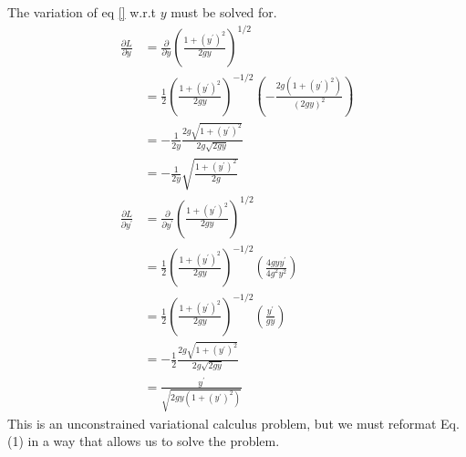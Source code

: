 \documentclass[11pt]{article}
\begin{document}
The variation of eq \ref{} w.r.t $y$ must be solved for.
\begin{align*}
    \frac{\partial L}{\partial y}        & = \frac{\partial}{\partial y} \left ({\frac{1 + (y^{\prime})^2}{2gy}} \right )^{1/2}                                           \\
                                         & = \frac{1}{2} \left ({\frac{1 + (y^{\prime})^2}{2gy}} \right )^{-1/2} \left ( -\frac{2g(1 + (y^{\prime})^2)}{(2gy)^2} \right ) \\
                                         & = -\frac{1}{2y} \frac{2g\sqrt{1 + (y^\prime)^2}}{2g\sqrt{2gy}}                                                                 \\
                                         & = -\frac{1}{2y} \sqrt{\frac{1 + (y^\prime)^2}{2g}}                                                                             \\
    \frac{\partial L}{\partial y^\prime} & = \frac{\partial}{\partial y^\prime} \left ({\frac{1 + (y^{\prime})^2}{2gy}} \right )^{1/2}                                    \\
                                         & = \frac{1}{2} \left ({\frac{1 + (y^{\prime})^2}{2gy}} \right )^{-1/2} \left ( \frac{4gyy^{\prime}}{4g^2y^2} \right )           \\
                                         & = \frac{1}{2} \left ({\frac{1 + (y^{\prime})^2}{2gy}} \right )^{-1/2} \left ( \frac{y^{\prime}}{gy} \right )                   \\
                                         & = -\frac{1}{2} \frac{2g\sqrt{1 + (y^\prime)^2}}{2g\sqrt{2gy}}                                                                  \\
                                         & = \frac{y^\prime}{\sqrt{2gy(1 + (y^\prime)^2)}}
\end{align*}
This is an unconstrained variational calculus problem, but we must reformat Eq. (1) in a way that allows us to solve the problem.



\newpage
\printbibliography
\end{document}
